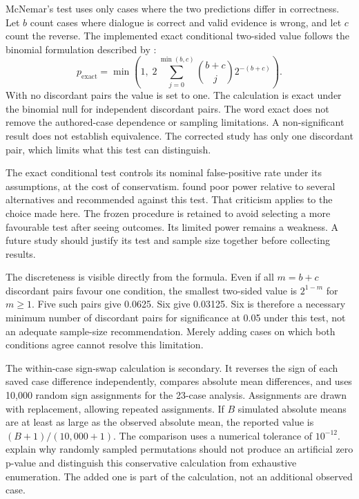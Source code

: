 McNemar's test uses only cases where the two predictions differ in correctness. Let $b$ count cases where dialogue is correct
and valid evidence is wrong, and let $c$ count the reverse. The implemented exact conditional two-sided value follows the
binomial formulation described by \textcite{fagerland2013mcnemar}:
\begin{equation}
  p_{\mathrm{exact}}=\min\left(1,\;2\sum_{j=0}^{\min(b,c)}
  \binom{b+c}{j}2^{-(b+c)}\right).
\end{equation}
With no discordant pairs the value is set to one. The calculation is exact under the binomial null for independent discordant
pairs. The word exact does not remove the authored-case dependence or sampling limitations. A non-significant result does
not establish equivalence. The corrected study has only one discordant pair, which limits what this test can distinguish.

The exact conditional test controls its nominal false-positive rate under its assumptions, at the cost of conservatism.
\textcite{fagerland2013mcnemar} found poor power relative to several alternatives and recommended against this test.
That criticism applies to the choice made here. The frozen procedure is retained to avoid selecting a more favourable test
after seeing outcomes. Its limited power remains a weakness. A future study should justify its test and sample size
together before collecting results.

The discreteness is visible directly from the formula. Even if all $m=b+c$ discordant pairs favour one condition, the smallest
two-sided value is $2^{1-m}$ for $m\geq1$. Five such pairs give 0.0625. Six give 0.03125. Six is therefore a necessary minimum
number of discordant pairs for significance at 0.05 under this test, not an adequate sample-size recommendation. Merely adding
cases on which both conditions agree cannot resolve this limitation.

The within-case sign-swap calculation is secondary. It reverses the sign of each saved case difference independently,
compares absolute mean differences, and uses 10,000 random sign assignments for the 23-case analysis. Assignments are drawn
with replacement, allowing repeated assignments. If $B$ simulated absolute means are at least as large as the observed
absolute mean, the reported value is $(B+1)/(10{,}000+1)$. The comparison uses a numerical tolerance of $10^{-12}$.
\Textcite{phipson2010permutation} explain why randomly sampled permutations should not produce an artificial zero p-value
and distinguish this conservative calculation from exhaustive enumeration. The added one is part of the calculation,
not an additional observed case.

